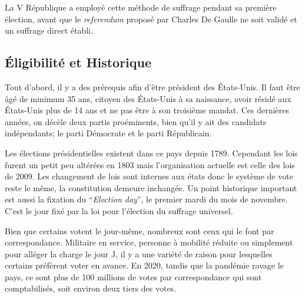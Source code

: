 \documentclass[12pt,a4paper]{report}
\begin{document}
La V République a employé cette méthode de suffrage pendant sa première élection, avant que le \textit{referendum} proposé par Charles De Gaulle ne soit validé et un suffrage direct établi. \nocite{polmania:scrutins}

\subsection{Éligibilité et Historique}

Tout d’abord, il y a des prérequis afin d’être président des États-Unis.
Il faut être âgé de minimum 35 ans, citoyen des États-Unis à sa naissance, avoir résidé aux États-Unis plus de 14 ans et ne pas être à son troisième mandat.
Ces dernières années, on décèle deux partis proéminents, bien qu'il y ait des candidats indépendants; le parti Démocrate et le parti Républicain.

Les élections présidentielles existent dans ce pays depuis 1789.
Cependant les lois furent un petit peu altérées en 1803 mais l'organisation actuelle est celle des lois de 2009.
Les changement de lois sont internes aux états donc le système de vote reste le même, la constitution demeure inchangée.
Un point historique important est aussi la fixation du “\textit{Election day}”, le premier mardi du mois de novembre.
C’est le jour fixé par la loi pour l'élection du suffrage universel.

Bien que certains votent le jour-même, nombreux sont ceux qui le font par correspondance.
Militaire en service, personne à mobilité réduite ou simplement pour alléger la charge le jour J, il y a une variété de raison pour lesquelles certains préfèrent voter en avance.
En 2020, tandis que la pandémie ravage le pays, ce sont plus de 100 millions de votes par correspondance qui sont comptabilisés, soit environ deux tiers des votes. \nocite{electproj:electproj}
\end{document}
